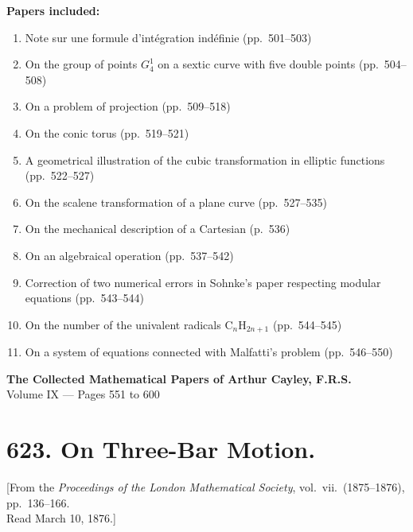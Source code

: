 \documentclass[11pt,a4paper]{book}
\begin{document}
\noindent\textbf{Papers included:}
\begin{enumerate}
\item[\textbf{[612]}] Note sur une formule d'int\'{e}gration ind\'{e}finie (pp.~501--503)
\item[\textbf{[613]}] On the group of points $G_4^1$ on a sextic curve with five double points (pp.~504--508)
\item[\textbf{[614]}] On a problem of projection (pp.~509--518)
\item[\textbf{[615]}] On the conic torus (pp.~519--521)
\item[\textbf{[616]}] A geometrical illustration of the cubic transformation in elliptic functions (pp.~522--527)
\item[\textbf{[617]}] On the scalene transformation of a plane curve (pp.~527--535)
\item[\textbf{[618]}] On the mechanical description of a Cartesian (p.~536)
\item[\textbf{[619]}] On an algebraical operation (pp.~537--542)
\item[\textbf{[620]}] Correction of two numerical errors in Sohnke's paper respecting modular equations (pp.~543--544)
\item[\textbf{[621]}] On the number of the univalent radicals C$_n$H$_{2n+1}$ (pp.~544--545)
\item[\textbf{[622]}] On a system of equations connected with Malfatti's problem (pp.~546--550)
\end{enumerate}
\clearpage


\begin{center}
{\Large\bfseries The Collected Mathematical Papers of Arthur Cayley, F.R.S.}\\[6pt]
{\large Volume IX --- Pages 551 to 600}
\end{center}


\newpage

\section*{623. On Three-Bar Motion.}

\begin{center}
\small[From the \textit{Proceedings of the London Mathematical Society}, vol.~vii.\ (1875--1876), pp.~136--166.\\Read March 10, 1876.]
\end{center}
\end{document}
